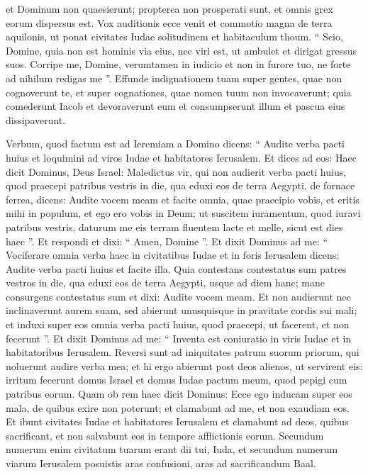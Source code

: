 \begin{biblechapter}
\begin{biblechapter}
\begin{biblechapter}
\begin{biblechapter}
\begin{biblechapter}
\begin{biblechapter}
\begin{biblechapter}
\begin{biblechapter}
\begin{biblechapter}
\begin{biblechapter}
 et Dominum non quaesierunt;
 propterea non prosperati sunt,
 et omnis grex eorum dispersus est.
 \verse Vox auditionis ecce venit
 et commotio magna de terra aquilonis,
 ut ponat civitates Iudae solitudinem
 et habitaculum thoum.
 \verse “ Scio, Domine, quia non est hominis via eius,
 nec viri est, ut ambulet et dirigat gressus suos.
 \verse Corripe me, Domine,
 verumtamen in iudicio et non in furore tuo,
 ne forte ad nihilum redigas me ”.
 \verse Effunde indignationem tuam super gentes,
 quae non cognoverunt te,
 et super cognationes,
 quae nomen tuum non invocaverunt;
 quia comederunt Iacob
 et devoraverunt eum
 et consumpserunt illum
 et pascua eius dissipaverunt.
 
\begin{biblechapter}
\verse Verbum, quod factum est ad Ieremiam a Domino dicens: 
\verse “ Audite verba pacti huius et loquimini ad viros Iudae et habitatores Ierusalem. 
\verse Et dices ad eos: Haec dicit Dominus, Deus Israel: Maledictus vir, qui non audierit verba pacti huius, 
\verse quod praecepi patribus vestris in die, qua eduxi eos de terra Aegypti, de fornace ferrea, dicens: Audite vocem meam et facite omnia, quae praecipio vobis, et eritis mihi in populum, et ego ero vobis in Deum; 
\verse ut suscitem iuramentum, quod iuravi patribus vestris, daturum me eis terram fluentem lacte et melle, sicut est dies haec ”. Et respondi et dixi: “ Amen, Domine ”.
 \verse Et dixit Dominus ad me: “ Vociferare omnia verba haec in civitatibus Iudae et in foris Ierusalem dicens: Audite verba pacti huius et facite illa. 
\verse Quia contestans contestatus sum patres vestros in die, qua eduxi eos de terra Aegypti, usque ad diem hanc; mane consurgens contestatus sum et dixi: Audite vocem meam. 
\verse Et non audierunt nec inclinaverunt aurem suam, sed abierunt unusquisque in pravitate cordis sui mali; et induxi super eos omnia verba pacti huius, quod praecepi, ut facerent, et non fecerunt ”.
 \verse Et dixit Dominus ad me: “ Inventa est coniuratio in viris Iudae et in habitatoribus Ierusalem. 
\verse Reversi sunt ad iniquitates patrum suorum priorum, qui noluerunt audire verba mea; et hi ergo abierunt post deos alienos, ut servirent eis: irritum fecerunt domus Israel et domus Iudae pactum meum, quod pepigi cum patribus eorum. 
\verse Quam ob rem haec dicit Dominus: Ecce ego inducam super eos mala, de quibus exire non poterunt; et clamabunt ad me, et non exaudiam eos. 
\verse Et ibunt civitates Iudae et habitatores Ierusalem et clamabunt ad deos, quibus sacrificant, et non salvabunt eos in tempore afflictionis eorum. 
\verse Secundum numerum enim civitatum tuarum erant dii tui, Iuda, et secundum numerum viarum Ierusalem posuistis aras confusioni, aras ad sacrificandum Baal.

\end{biblechapter}
\end{biblechapter}
\end{biblechapter}
\end{biblechapter}
\end{biblechapter}
\end{biblechapter}
\end{biblechapter}
\end{biblechapter}
\end{biblechapter}
\end{biblechapter}
\end{biblechapter}
